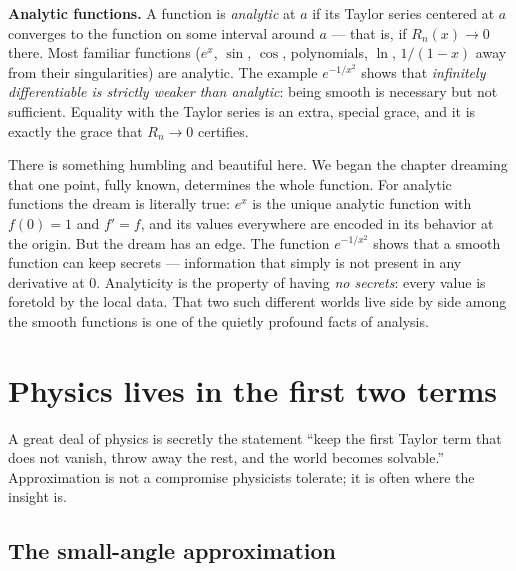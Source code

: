 \begin{focusbox}
\textbf{Analytic functions.} A function is \emph{analytic} at $a$ if its Taylor
series centered at $a$ converges to the function on some interval around $a$ --- that
is, if $R_n(x) \to 0$ there. Most familiar functions ($e^x$, $\sin$, $\cos$,
polynomials, $\ln$, $1/(1-x)$ away from their singularities) are analytic. The
example $e^{-1/x^2}$ shows that \emph{infinitely differentiable is strictly weaker
than analytic}: being smooth is necessary but not sufficient. Equality with the
Taylor series is an extra, special grace, and it is exactly the grace that
$R_n \to 0$ certifies.
\end{focusbox}

\begin{aestheticbox}
There is something humbling and beautiful here. We began the chapter dreaming that one
point, fully known, determines the whole function. For analytic functions the dream
is literally true: $e^x$ is the unique analytic function with $f(0)=1$ and $f'=f$, and
its values everywhere are encoded in its behavior at the origin. But the dream has an
edge. The function $e^{-1/x^2}$ shows that a smooth function can keep secrets ---
information that simply is not present in any derivative at $0$. Analyticity is the
property of having \emph{no secrets}: every value is foretold by the local data. That
two such different worlds live side by side among the smooth functions is one of the
quietly profound facts of analysis.
\end{aestheticbox}

\section{Physics lives in the first two terms}

A great deal of physics is secretly the statement ``keep the first Taylor term that
does not vanish, throw away the rest, and the world becomes solvable.'' Approximation
is not a compromise physicists tolerate; it is often where the insight is.

\subsection{The small-angle approximation}

